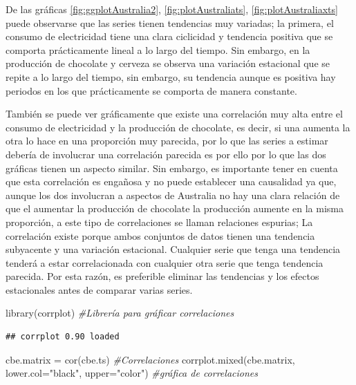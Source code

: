 \documentclass[
  spanish,
]{book}
\newenvironment{Shaded}{\begin{snugshade}}{\end{snugshade}}
\newcommand{\AttributeTok}[1]{\textcolor[rgb]{0.77,0.63,0.00}{#1}}
\newcommand{\CommentTok}[1]{\textcolor[rgb]{0.56,0.35,0.01}{\textit{#1}}}
\newcommand{\FunctionTok}[1]{\textcolor[rgb]{0.00,0.00,0.00}{#1}}
\newcommand{\NormalTok}[1]{#1}
\newcommand{\OtherTok}[1]{\textcolor[rgb]{0.56,0.35,0.01}{#1}}
\newcommand{\StringTok}[1]{\textcolor[rgb]{0.31,0.60,0.02}{#1}}
\theoremstyle{remark}
\begin{document}
De las gráficas \ref{fig:ggplotAustralia2}, \ref{fig:plotAustraliats}, \ref{fig:plotAustraliaxts} puede observarse que las series tienen tendencias muy variadas; la primera, el consumo de electricidad tiene una clara ciclicidad y tendencia positiva que se comporta prácticamente lineal a lo largo del tiempo. Sin embargo, en la producción de chocolate y cerveza se observa una variación estacional que se repite a lo largo del tiempo, sin embargo, su tendencia aunque es positiva hay periodos en los que prácticamente se comporta de manera constante.

También se puede ver gráficamente que existe una correlación muy alta entre el consumo de electricidad y la producción de chocolate, es decir, si una aumenta la otra lo hace en una proporción muy parecida, por lo que las series a estimar debería de involucrar una correlación parecida es por ello por lo que las dos gráficas tienen un aspecto similar. Sin embargo, es importante tener en cuenta que esta correlación es engañosa y no puede establecer una causalidad ya que, aunque los dos involucran a aspectos de Australia no hay una clara relación de que el aumentar la producción de chocolate la producción aumente en la misma proporción, a este tipo de correlaciones se llaman relaciones espurias; La correlación existe porque ambos conjuntos de datos tienen una tendencia subyacente y una variación estacional. Cualquier serie que tenga una tendencia tenderá a estar correlacionada con cualquier otra serie que tenga tendencia parecida. Por esta razón, es preferible eliminar las tendencias y los efectos estacionales antes de comparar varias series.

\begin{Shaded}
\begin{Highlighting}[]
\FunctionTok{library}\NormalTok{(corrplot) }\CommentTok{\#Librería para gráficar correlaciones}
\end{Highlighting}
\end{Shaded}

\begin{verbatim}
## corrplot 0.90 loaded
\end{verbatim}

\begin{Shaded}
\begin{Highlighting}[]
\NormalTok{cbe.matrix }\OtherTok{=} \FunctionTok{cor}\NormalTok{(cbe.ts) }\CommentTok{\#Correlaciones}
\FunctionTok{corrplot.mixed}\NormalTok{(cbe.matrix, }\AttributeTok{lower.col=}\StringTok{"black"}\NormalTok{, }\AttributeTok{upper=}\StringTok{"color"}\NormalTok{) }\CommentTok{\#gráfica de correlaciones}
\end{Highlighting}
\end{Shaded}
\end{document}
